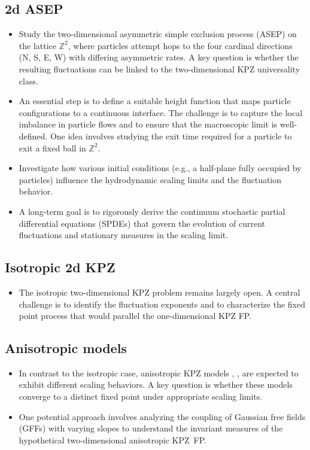 \documentclass{article}
\theoremstyle{definition}
\begin{document}
\subsection{2d ASEP}
\begin{itemize}
    \item Study the two-dimensional asymmetric simple exclusion process (ASEP) on the lattice $\mathbb{Z}^2$, where particles attempt hops to the four cardinal directions (N, S, E, W) with differing asymmetric rates. A key question is whether the resulting fluctuations can be linked to the two-dimensional KPZ universality class.
    \item An essential step is to define a suitable height function that maps particle configurations to a continuous interface. The challenge is to capture the local imbalance in particle flows and to ensure that the macroscopic limit is well-defined.
		One idea involves studying the exit time required for a particle to exit a fixed ball in $\mathbb{Z}^2$.
    \item Investigate how various initial conditions (e.g., a half-plane fully occupied by particles) influence the hydrodynamic scaling limits and the fluctuation behavior.
    \item A long-term goal is to rigorously derive the continuum stochastic partial differential equations (SPDEs) that govern the evolution of current fluctuations and stationary measures in the scaling limit.
\end{itemize}

\subsection{Isotropic 2d KPZ}
\begin{itemize}
    \item The isotropic two-dimensional KPZ problem remains largely open. A central challenge is to identify the fluctuation exponents and to characterize the fixed point process that would parallel the one-dimensional KPZ FP.
\end{itemize}

\subsection{Anisotropic models}
\begin{itemize}
	\item In contrast to the isotropic case, anisotropic KPZ models \cite{BorFerr2008DF}, \cite{borodin2016stochastic},
		\cite{borodin2018two} are expected to exhibit different scaling behaviors. A key question is whether these models converge to a distinct fixed point under appropriate scaling limits.
    \item One potential approach involves analyzing the coupling of Gaussian free fields (GFFs) with varying slopes to understand the invariant measures of the hypothetical two-dimensional anisotropic KPZ~FP.
\end{itemize}
\end{document}
